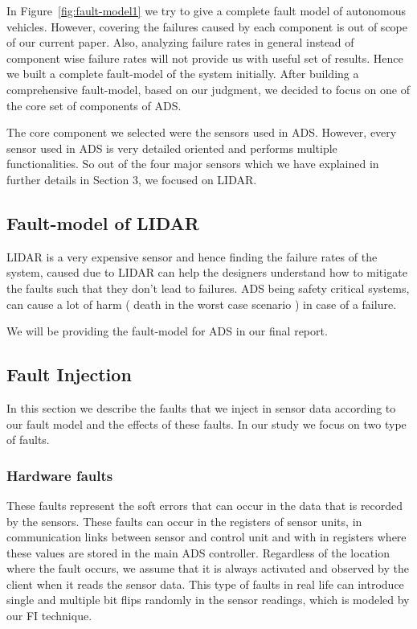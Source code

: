 In Figure~\ref{fig:fault-model1} we try to give a complete fault model of autonomous vehicles. However, covering the failures caused by each component is out of scope of our current paper. Also, analyzing failure rates in general instead of component wise failure rates will not provide us with useful set of results. Hence we built a complete fault-model of the system initially. After building a comprehensive fault-model, based on our judgment, we decided to focus on one of the core set of components of ADS.

 The core component we selected were the  sensors used in ADS. However, every sensor used in ADS is very detailed oriented and performs multiple functionalities. So out of the four major sensors which we have explained in further details in Section 3, we focused on LIDAR. 
 
 \subsection{Fault-model of LIDAR}
 LIDAR is a very expensive sensor and hence finding the failure rates of the system, caused due to LIDAR can help the designers understand how to mitigate the faults such that they don't lead to failures. ADS being safety critical systems, can cause a lot of harm ( death in the worst case scenario ) in case of a failure. 
 
 We will be providing the fault-model for ADS in our final report.
 
\subsection{Fault Injection} \label{fi_m}
In this section we describe the faults that we inject in sensor data according to our fault model and the effects of these faults. In our study we focus on two type of faults.

\subsubsection{Hardware faults} These faults represent the soft errors that can occur in the data that is recorded by the sensors. These faults can occur in the registers of sensor units, in communication links between sensor and control unit and with in registers where these values are stored in the main ADS controller. Regardless of the location where the fault occurs, we assume that it is always activated and observed by the client when it reads the sensor data. This type of faults in real life can introduce single and multiple bit flips randomly in the sensor readings, which is modeled by our FI technique.
	
